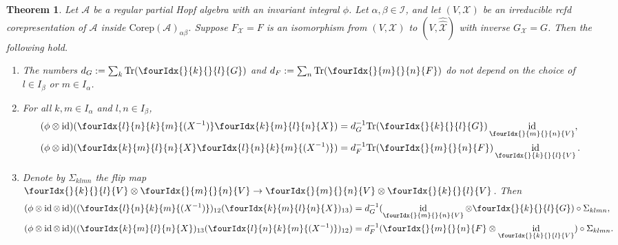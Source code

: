 \documentclass[11pt]{article}
\DeclareMathOperator{\id}{id}
\newcommand{\Corep}{\mathrm{Corep}}
\newcommand{\Tr}{\mathrm{Tr}}
\newcommand{\Gr}[5]{\fourIdx{#2}{#4}{#3}{#5}{#1}}%
\newcommand{\Gru}[3]{\Gr{#1}{}{}{#2}{#3}}
\newtheorem{Theorem}{Theorem}[section]
\theoremstyle{definition}
\numberwithin{equation}{section}
\begin{document}
\begin{Theorem} \label{thm:rep-orthogonality} Let $\mathcal{A}$ be a
  regular partial Hopf algebra with an invariant integral $\phi$. Let $\alpha,\beta\in \mathscr{I}$, and let $(V,\mathscr{X})$
  be an irreducible rcfd corepresentation of $\mathscr{A}$ inside $\Corep(\mathscr{A})_{\alpha\beta}$. Suppose
  $F_{\mathscr{X}}=F$ is an isomorphism from $(V,\mathscr{X})$ to
  $(V,\hat{\hat{\mathscr{X}}})$ with inverse
  $G_{\mathscr{X}}= G$. Then the following hold.
  \begin{enumerate}[label=(\arabic*)]
  \item The numbers $d_G:=\sum_{k} \Tr (\Gru{G}{k}{l})$ and $d_F:=\sum_{n} \Tr (\Gru{F}{m}{n})$ do not depend on the choice of $l \in I_\beta$ or $m\in I_\alpha$.
    \item  For all $k,m \in I_\alpha$ and $l,n\in I_\beta$,
    \begin{align*}
      (\phi \otimes \id)(\Gr{(X^{-1})}{l}{k}{n}{m}\Gr{X}{k}{l}{m}{n})
      &=d_G^{-1}\Tr(\Gru{G}{k}{l})
      \id_{\Gru{V}{m}{n}}, \\
      (\phi \otimes \id)(\Gr{X}{k}{l}{m}{n}\Gr{(X^{-1})}{l}{k}{n}{m})
      &=d_F^{-1}\Tr(\Gru{F}{m}{n})
      \id_{\Gru{V}{k}{l}}.
    \end{align*}
  \item Denote by $\Sigma_{klmn}$ the flip map $\Gru{V}{k}{l}
    \otimes \Gru{V}{m}{n} \to \Gru{V}{m}{n}
    \otimes \Gru{V}{k}{l}$. Then
 \begin{align*}
   (\phi \otimes \id \otimes
   \id)((\Gr{(X^{-1})}{l}{k}{n}{m})_{12}(\Gr{X}{k}{l}{m}{n})_{13}) &=
   d_G^{-1}
   (\id_{\Gru{V}{m}{n}} \otimes \Gru{G}{k}{l})
   \circ \Sigma_{klmn}, \\
   (\phi \otimes \id \otimes
   \id)((\Gr{X}{k}{l}{m}{n})_{13}(\Gr{(X^{-1})}{l}{k}{n}{m})_{12}) &= d_F^{-1} (\Gru{F}{m}{n}
   \otimes \id_{\Gru{V}{k}{l}}) \circ \Sigma_{klmn}.
 \end{align*}
\end{enumerate}
  \end{Theorem}
\end{document}
